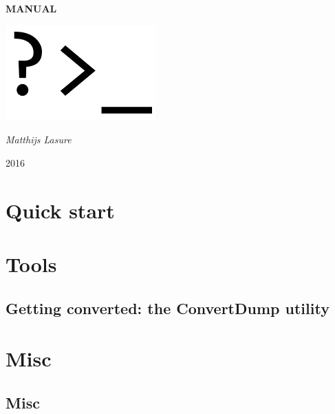 \documentclass[a4paper,fleqn]{report}
\begin{document}
	
	\pagestyle{MyStyle}
	
	\begin{titlepage}
		\centering
		\null
		\vspace{5cm}

		{\huge\bfseries MANUAL\par}
		\vspace{1.5cm}
		\includegraphics[width=0.5\linewidth]{images/prompt.png}
		\vfill
		
		{\Large\itshape Matthijs Lasure\par}
		
		\vspace{1.5cm}
		
		{\large 2016\par}
		
	\end{titlepage}
	
	\tableofcontents
	
	\part{Quick start}
	

	
	\part{Tools}
	\chapter{Getting converted: the ConvertDump utility}\label{chap:convertdump}
	
	
	\part{Misc}
	\chapter{Misc}
	
	
	\newpage
	\begin{spacing}{0.75}
		\label{Referenties}
		\clearpage
		\renewcommand{\bibname}{Referenties}
		
	\end{spacing}
\end{document}
